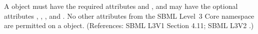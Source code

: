 A \SpeciesReference object must have the required attributes
 and , and may have the optional attributes
, , ,  and
.  No other attributes from the SBML Level~3 Core
namespace are permitted on a \SpeciesReference object.  (References: SBML L3V1 Section 4.11; SBML
L3V2 .)
